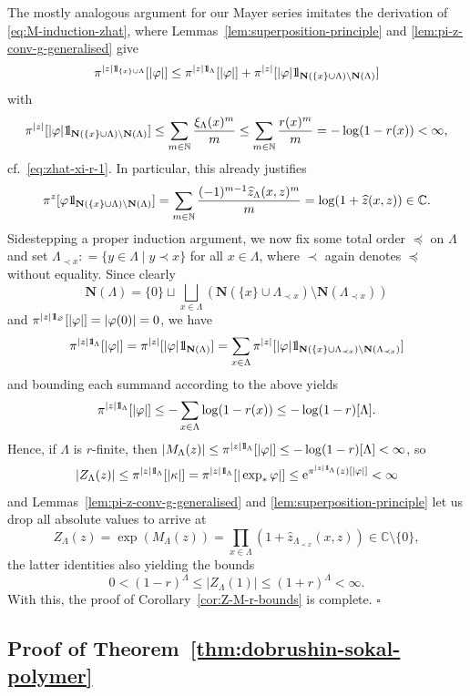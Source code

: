 \documentclass[reqno, 11pt]{amsart}
\theoremstyle{definition}
\newcommand{\e}{\mathrm{e}}
\newcommand{\N}{\mathbb{N}}
\newcommand{\C}{\mathbb{C}}
\def\1{{\mathchoice {1\mskip-4mu\mathrm l}      
{1\mskip-4mu\mathrm l}
{1\mskip-4.5mu\mathrm l} {1\mskip-5mu\mathrm l}}}
\begin{document}
The mostly analogous argument for our Mayer series imitates the derivation of \eqref{eq:M-induction-zhat}, where Lemmas~\ref{lem:superposition-principle} and \ref{lem:pi-z-conv-g-generalised} give
\[
	\pi^{|z| \1_{\{x\} \cup \Lambda}}[|\varphi|] \leq \pi^{|z| \1_\Lambda}[|\varphi|] + \pi^{|z|}[|\varphi| \1_{\mathbf N(\{x\} \cup \Lambda) \setminus \mathbf N(\Lambda)}]
\]
with
\[
	\pi^{|z|}[|\varphi| \1_{\mathbf N(\{x\} \cup \Lambda) \setminus \mathbf N(\Lambda)}] \leq \sum_{m \in \N} \frac{\xi_\Lambda(x)^m}{m} \leq \sum_{m \in \N} \frac{r(x)^m}{m} = - \log(1 - r(x)) < \infty,
\]
cf.\ \eqref{eq:zhat-xi-r-1}. 
In particular, this already justifies
\[
	\pi^{z}[\varphi \1_{\mathbf N(\{x\} \cup \Lambda) \setminus \mathbf N(\Lambda)}] = \sum_{m \in \N} \frac{(-1)^{m-1} \widehat z_\Lambda(x, z)^m}{m} = \log(1 + \widehat z(x, z)) \in \C.
\]
Sidestepping a proper induction argument, we now fix some total order $\preceq$ on $\Lambda$ and set $\Lambda_{\prec x} : = \{y \in \Lambda \mid y \prec x\}$ for all $x \in \Lambda$, where $\prec$ again denotes $\preceq$ without equality. 
Since clearly
\[
	\mathbf N(\Lambda) = \{0\} \sqcup \bigsqcup_{x \in \Lambda} (\mathbf N(\{x\} \cup \Lambda_{\prec x}) \setminus \mathbf N(\Lambda_{\prec x}))
\]
and $\pi^{|z| \1_\varnothing}[|\varphi|] = |\varphi(0)| = 0$, we have
\[
	\pi^{|z| \1_\Lambda}[|\varphi|] = \pi^{|z|}[|\varphi| \1_{\mathbf N(\Lambda)}] = \sum_{x \in \Lambda} \pi^{|z|}[|\varphi| \1_{\mathbf N(\{x\} \cup \Lambda_{\prec x}) \setminus \mathbf N(\Lambda_{\prec x})}]
\]
and bounding each summand according to the above yields
\[
	\pi^{|z| \1_\Lambda}[|\varphi|] \leq - \sum_{x \in \Lambda} \log(1 - r(x)) \leq - \log(1 - r)[\Lambda].
\]
Hence, if $\Lambda$ is $r$-finite, then $|M_\Lambda(z)| \leq \pi^{|z| \1_\Lambda}[|\varphi|] \leq - \log(1 - r)[\Lambda] < \infty$, so
\[
	|Z_\Lambda(z)| \leq \pi^{|z| \1_\Lambda}[|\kappa|] = \pi^{|z| \1_\Lambda}[|\exp_\ast \varphi|] \leq \e^{\pi^{|z| \1_\Lambda}(z)[|\varphi|]} 	< \infty
\]
and Lemmas~\ref{lem:pi-z-conv-g-generalised} and \ref{lem:superposition-principle} let us drop all absolute values to arrive at
\[
	Z_\Lambda(z) = \exp(M_\Lambda(z)) = \prod_{x \in \Lambda} (1 + \widehat z_{\Lambda_{\prec x}}(x, z)) \in \C \setminus \{0\},
\]
the latter identities also yielding the bounds
\[
	0 < (1 - r)^\Lambda \leq |Z_\Lambda(1)| \leq (1 + r)^\Lambda < \infty.
\]
With this, the proof of Corollary~\ref{cor:Z-M-r-bounds} is complete.
\hfill $\square$

\subsection{Proof of Theorem~\ref{thm:dobrushin-sokal-polymer}}
\end{document}
